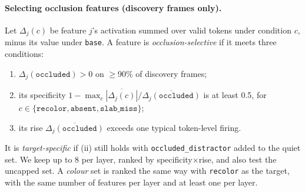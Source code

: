 \documentclass{article} %
\newcommand{\occ}{\texttt{occluded}}
\newcommand{\cond}[1]{\texttt{#1}}
\begin{document}
\paragraph{Selecting occlusion features (discovery frames only).} Let $\Delta_j(c)$ be feature $j$'s activation summed over valid tokens under condition $c$, minus its value under \cond{base}. A feature is \emph{occlusion-selective} if it meets three conditions:
\begin{enumerate}[leftmargin=*,itemsep=0pt,topsep=1pt,label=(\roman*)]
  \item $\Delta_j(\occ)>0$ on $\ge$90\% of discovery frames;
  \item its specificity $1-\max_c\overline{|\Delta_j(c)|}/\overline{\Delta_j(\occ)}$ is at least 0.5, for $c\in\{\cond{recolor},\cond{absent},\cond{slab\_miss}\}$;
  \item its rise $\overline{\Delta_j(\occ)}$ exceeds one typical token-level firing.
\end{enumerate}
It is \emph{target-specific} if (ii) still holds with \cond{occluded\_distractor} added to the quiet set. We keep up to 8 per layer, ranked by specificity$\times$rise, and also test the uncapped set. A \emph{colour} set is ranked the same way with \cond{recolor} as the target, with the same number of features per layer and at least one per layer.
\end{document}
